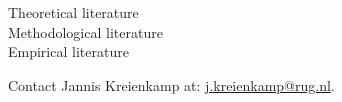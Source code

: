 \faSquareO \vspace{1em} Theoretical literature\\
\faSquareO \vspace{1em} Methodological literature\\
\faSquareO \vspace{1em} Empirical literature



\divider

\divider

\divider

\divider

\divider

\divider

\divider

\divider





Contact Jannis Kreienkamp at: \href{mailto:j.kreienkamp@rug.nl}{j.kreienkamp@rug.nl}.


